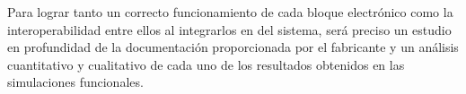 Para lograr tanto un correcto funcionamiento de cada bloque electrónico como la interoperabilidad entre ellos al integrarlos en del sistema, será preciso un estudio en profundidad de la documentación proporcionada por el fabricante y un análisis cuantitativo y cualitativo de cada uno de los resultados obtenidos en las simulaciones funcionales. 

\vspace{1mm}








